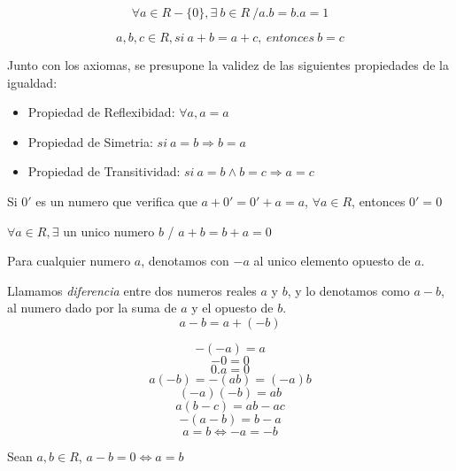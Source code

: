 \documentclass[10pt]{article}
\begin{document}
\begin{axiom}{}
$$\forall a \in R-\{0\}, \exists\ b \in R\ / a.b = b.a = 1$$
\end{axiom}

\begin{theo}{}
$$a,b,c \in R, si\ a+b = a+c,\ entonces\ b=c $$
\end{theo}

\begin{data}{}
Junto con los axiomas, se presupone la validez de las siguientes propiedades de la igualdad:
\begin{itemize}
\item Propiedad de Reflexibidad: $\forall a, a=a$
\item Propiedad de Simetria: $si\ a=b \Rightarrow b=a$
\item Propiedad de Transitividad: $si\ a=b \land b=c \Rightarrow a=c$
\end{itemize}
\end{data}

\newpage

\begin{cor}{}
Si $0'$ es un numero que verifica que $a+0' = 0'+a = a$, $\forall a \in R$, entonces $0' = 0$
\end{cor}

\begin{cor}{}
$\forall a \in R, \exists$ un unico numero $b$ / $a+b=b+a =0$
\end{cor}

\begin{data}{}
Para cualquier numero $a$, denotamos con $-a$ al unico elemento opuesto de $a$.

Llamamos \textit{diferencia} entre dos numeros reales $a$ y $b$, y lo denotamos como $a-b$, al numero dado por la suma de $a$ y el opuesto de $b$.
$$a-b = a+ (-b)$$
\end{data}

\begin{theo}[]{}
\begin{multicols}{2}
$$-(-a)=a$$
$$-0 = 0$$
$$0.a = 0$$
$$a(-b) = -(ab) = (-a)b$$
$$(-a)(-b)=ab$$
$$a(b-c)=ab-ac$$
$$-(a-b)=b-a$$
$$a=b \iff -a=-b$$
\end{multicols}
\end{theo}

\begin{property}[Propiedad]{}
Sean $a,b \in R$, $a-b=0 \iff a=b$
\end{property}
\end{document}
